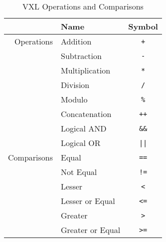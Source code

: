 \begin{table}[htbp]
\centering
	\caption{VXL Operations and Comparisons}
	\begin{tabular}{r||lc}
		             & \textbf{Name}        & \textbf{Symbol} \\
		\hline
		Operations   & Addition             & \verb_+_	      \\
		             & Subtraction         & \verb_-_	      \\
		             & Multiplication       & \verb_*_        \\
		             & Division             & \verb_/_        \\
		             & Modulo               & \verb_%_        \\
		             & Concatenation        & \verb_++_       \\
		             & Logical \textsc{AND} & \verb_&&_       \\
		             & Logical \textsc{OR}  & \verb_||_       \\
		\hline
		Comparisons & Equal                & \verb_==_       \\
		             & Not Equal            & \verb_!=_       \\
		             & Lesser               & \verb_<_        \\
		             & Lesser or Equal      & \verb_<=_       \\
		             & Greater              & \verb_>_        \\
		             & Greater or Equal     & \verb_>=_
	\end{tabular}
	\label{tab:vxl_op}
\end{table}
